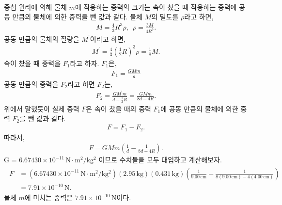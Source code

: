 \documentclass[floatfix,nofootinbib,superscriptaddress,fleqn]{revtex4-2}
\begin{document}
중첩 원리에 의해 물체 $m$에 작용하는 중력의 크기는 속이 찼을 때 
작용하는 중력에 공동 만큼의 물체에 의한 중력을 뺀 값과 같다.
물체 $M$의 밀도를 $\rho$라고 하면,
\begin{align}
    M = \frac{4}{3}R^3\rho ,\,\,\,\rho = \frac{3M}{4R^3}.
\end{align}
공동 만큼의 물체의 질량을 $M^\prime$이라고 하면,
\begin{align}
    M^\prime = \frac{4}{3}{\left(\frac{1}{2}R\right)}^3\rho=\frac{1}{8}M.
\end{align}
속이 찼을 때 중력을 $F_1$라고 하자. $F_1$은,
\begin{align}
    F_1 = \frac{GMm}{d}
\end{align}
공동 만큼의 중력을 $F_2$라고 하면 $F_2$는,
\begin{align}
    F_2 = \frac{GM^\prime m}{d-\frac{1}{2}R}=\frac{GMm}
    {8d-4R}.
\end{align}
위에서 말했듯이 실제 중력 $F$은 속이 찼을 때의 중력 $F_1$에 공동 만큼의 물체에 의한 중력 $F_2$를
뺀 값과 같다.
\begin{align}
    F= F_1 - F_2.
\end{align}
따라서,
\begin{align}
    F = GMm\left(\frac{1}{d}-\frac{1}{8d-4R}\right).
\end{align}
 G = $6.67430\times 10^{-11}\,\mathrm{N\cdot m^2/kg^2}$ 이므로 수치들을 모두 대입하고 계산해보자.
\begin{align}
    \begin{split}
        F &= \left(6.67430\times 10^{-11}\,\mathrm{N\cdot m^2/kg^2}\right)
        (2.95\,\mathrm{kg})(0.431\,\mathrm{kg})
        \left(\frac{1}{9.00\,\mathrm{cm}}
        -\frac{1}{8(9.00\,\mathrm{cm})-4(4.00\,\mathrm{cm})}\right) \\
        &=  7.91\times 10^{-10}\,\mathrm{N}.  
    \end{split}
\end{align}
물체 $m$에 미치는 중력은 $7.91\times 10^{-10}\,\mathrm{N}$이다.
\vspace{1.cm}

\end{document}

